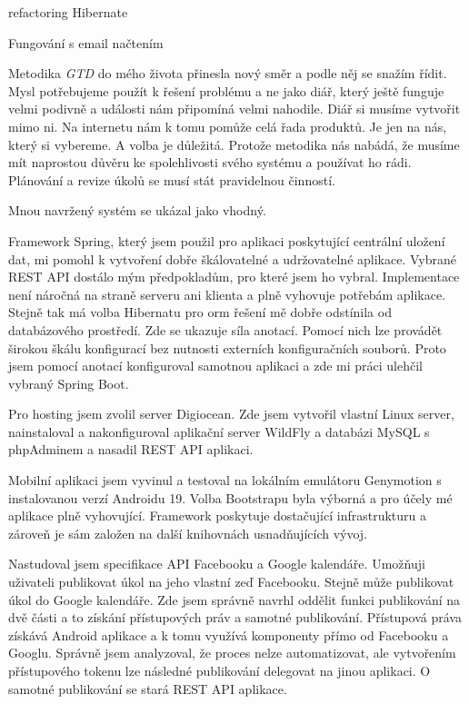 \documentclass[thesis=B,czech]{FITthesis}[2012/06/26]
\newcommand{\GTD}{\textit{GTD }}
\begin{document}
refactoring Hibernate


Fungování s email načtením

\begin{conclusion}

Metodika \GTD do mého života přinesla nový směr a podle něj se snažím řídit. Mysl potřebujeme použít k řešení problému a ne jako diář, který ještě funguje velmi podivně a události nám připomíná velmi nahodile. Diář si musíme vytvořit mimo ni. Na internetu nám k tomu pomůže celá řada produktů. Je jen na nás, který si vybereme. A volba je důležitá. Protože metodika nás nabádá, že musíme mít naprostou důvěru ke spolehlivosti svého systému a používat ho rádi. Plánování a revize úkolů se musí stát pravidelnou činností.

Mnou navržený systém se ukázal jako vhodný.

Framework Spring, který jsem použil pro aplikaci poskytující centrální uložení dat, mi pomohl k vytvoření dobře škálovatelné a udržovatelné aplikace. Vybrané REST API dostálo mým předpokladům, pro které jsem ho vybral. Implementace není náročná na straně serveru ani klienta a plně vyhovuje potřebám aplikace. Stejně tak má volba Hibernatu pro \acrshort{orm} řešení mě dobře odstínila od databázového prostředí. Zde se ukazuje síla anotací. Pomocí nich lze provádět širokou škálu konfigurací bez nutnosti externích konfiguračních souborů. Proto jsem pomocí anotací konfiguroval  samotnou aplikaci a zde mi práci ulehčil vybraný Spring Boot. 

Pro hosting jsem zvolil server Digiocean. Zde jsem vytvořil vlastní Linux server, nainstaloval a nakonfiguroval aplikační server WildFly a databázi MySQL s phpAdminem a nasadil REST API aplikaci.

Mobilní aplikaci jsem vyvinul a testoval na lokálním emulátoru Genymotion s instalovanou verzí Androidu 19. Volba Bootstrapu byla výborná a pro účely mé aplikace plně vyhovující. Framework poskytuje dostačující infrastrukturu a zároveň je sám založen na další knihovnách usnadňujících vývoj. 

Nastudoval jsem specifikace API Facebooku a Google kalendáře. Umožňuji uživateli publikovat úkol na jeho vlastní zeď Facebooku. Stejně může publikovat úkol do Google kalendáře. Zde jsem správně navrhl oddělit funkci publikování na dvě části a to získání přístupových práv a samotné publikování. Přístupová práva získává Android aplikace a k tomu využívá komponenty přímo od Facebooku a Googlu. Správně jsem analyzoval, že proces nelze automatizovat, ale vytvořením přístupového tokenu lze následné publikování delegovat na jinou aplikaci. O samotné publikování se stará REST API aplikace.


\end{conclusion}
\end{document}

